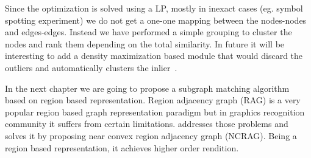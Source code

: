 Since the optimization is solved using a LP, mostly in inexact cases (eg. symbol spotting experiment) we do not get a one-one mapping between the nodes-nodes and edges-edges. Instead we have performed a simple grouping to cluster the nodes and rank them depending on the total similarity. In future it will be interesting to add a density maximization based module that would discard the outliers and automatically clusters the inlier~\cite{Wang2013}.

In the next chapter we are going to propose a subgraph matching algorithm based on region based representation. Region adjacency graph (RAG) is a very popular region based graph representation paradigm but in graphics recognition community it suffers from certain limitations.  addresses those problems and solves it by proposing near convex region adjacency graph (NCRAG). Being a region based representation, it achieves higher order rendition.